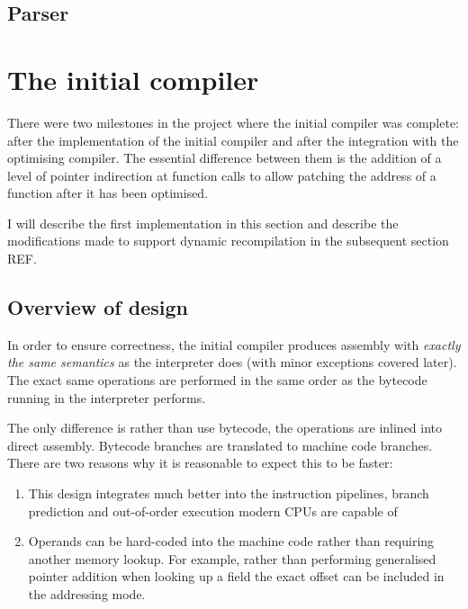 \subsection{Parser}

\section{The initial compiler}

There were two milestones in the project where the initial compiler was complete: after the
implementation of the initial compiler and after the integration with the optimising compiler. The
essential difference between them is the addition of a level of pointer indirection at function
calls to allow patching the address of a function after it has been optimised.

I will describe the first implementation in this section and describe the modifications made to
support dynamic recompilation in the subsequent section REF.

\subsection{Overview of design}

In order to ensure correctness, the initial compiler produces assembly with \emph{exactly the same
      semantics} as the interpreter does (with minor exceptions covered later). The exact same
operations
are performed in the same order as the bytecode running in the interpreter performs.

The only difference is rather than use bytecode, the operations are inlined into direct assembly.
Bytecode branches are translated to machine code branches. There are two reasons why it is
reasonable to expect this to be faster:

\begin{enumerate}
      \item This design integrates much better into the instruction pipelines, branch prediction
            and
            out-of-order execution modern CPUs are capable of
      \item Operands can be hard-coded into the machine code rather than requiring another memory
            lookup. For example, rather than performing generalised pointer addition when looking
            up
            a field
            the exact offset can be included in the addressing mode.
\end{enumerate}

